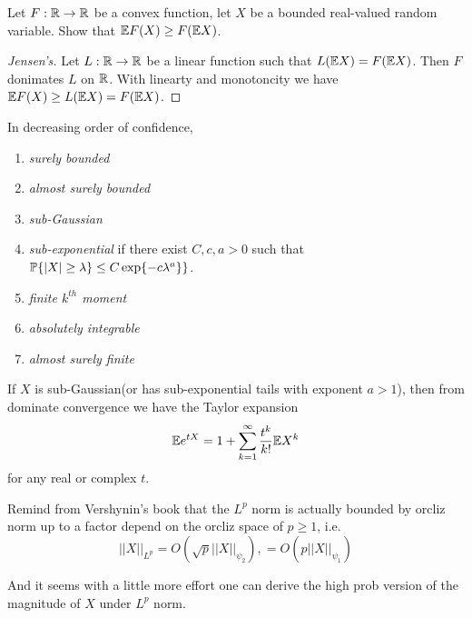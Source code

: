 \begin{theorem}
    Let $F:\mathbb{R} \to \mathbb{R}$ be a convex function, let $X$ be a bounded real-valued random variable. Show that $\mathbb{E} F(X) \geq F(\mathbb{E} X)$.
\end{theorem}
\begin{proof}[Jensen's]
    Let $L:\mathbb{R} \to \mathbb{R}$ be a linear function such that $L(\mathbb{E} X) = F(\mathbb{E} X)$. Then $F$ donimates $L$ on $\mathbb{R}$. 
    With linearty and monotoncity we have $\mathbb{E} F(X) \geq  L(\mathbb{E} X) = F(\mathbb{E} X)$.
\end{proof}

\begin{definition}In decreasing order of confidence,
    \begin{enumerate}
        \item \textit{surely bounded} 
        \item \textit{almost surely bounded}
        \item \textit{sub-Gaussian} 
        \item \textit{sub-exponential} if there exist $C,c,a > 0$ such that $\mathbb{P}\{|X|\geq \lambda \}\leq C\exp\{-c\lambda^a\}\}$.
        \item \textit{finite $k^{th}$ moment}
        \item \textit{absolutely integrable}
        \item \textit{almost surely finite}
    \end{enumerate}
\end{definition}

\begin{remark}
    If $X$ is sub-Gaussian(or has sub-exponential tails with exponent $a>1$), then from dominate convergence we have the Taylor expansion
    \begin{equation}
        \mathbb{E} e^{tX} = 1+ \sum_{k=1}^\infty \frac{t^k}{k!}\mathbb{E} X^k
    \end{equation}
    for any real or complex $t$.
\end{remark}

Remind from Vershynin's book that the $L^p$ norm is actually bounded by orcliz norm up to a factor depend on the orcliz space of $p\geq1$, i.e.
\begin{equation}
    ||X||_{L^p} = O(\sqrt{p}||X||_{\psi_2}), = O(p||X||_{\psi_1})
\end{equation}

And it seems with a little more effort one can derive the high prob version of the magnitude of $X$ under $L^p$ norm.

